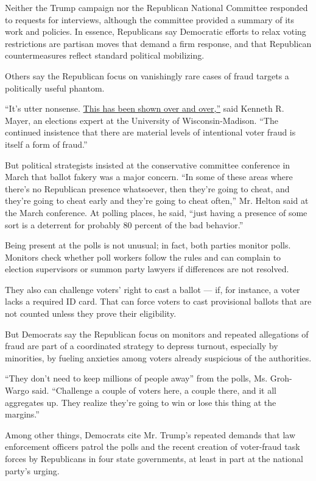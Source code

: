 Neither the Trump campaign nor the Republican National Committee
responded to requests for interviews, although the committee provided a
summary of its work and policies. In essence, Republicans say Democratic
efforts to relax voting restrictions are partisan moves that demand a
firm response, and that Republican countermeasures reflect standard
political mobilizing.

Others say the Republican focus on vanishingly rare cases of fraud
targets a politically useful phantom.

``It's utter nonsense.
\href{https://www.brennancenter.org/sites/default/files/legal-work/Briefing_Memo_Debunking_Voter_Fraud_Myth.pdf}{This
has been shown over and over,''} said Kenneth R. Mayer, an elections
expert at the University of Wisconsin-Madison. ``The continued
insistence that there are material levels of intentional voter fraud is
itself a form of fraud.''

But political strategists insisted at the conservative committee
conference in March that ballot fakery was a major concern. ``In some of
these areas where there's no Republican presence whatsoever, then
they're going to cheat, and they're going to cheat early and they're
going to cheat often,'' Mr. Helton said at the March conference. At
polling places, he said, ``just having a presence of some sort is a
deterrent for probably 80 percent of the bad behavior.''

Being present at the polls is not unusual; in fact, both parties monitor
polls. Monitors check whether poll workers follow the rules and can
complain to election supervisors or summon party lawyers if differences
are not resolved.

They also can challenge voters' right to cast a ballot --- if, for
instance, a voter lacks a required ID card. That can force voters to
cast provisional ballots that are not counted unless they prove their
eligibility.

But Democrats say the Republican focus on monitors and repeated
allegations of fraud are part of a coordinated strategy to depress
turnout, especially by minorities, by fueling anxieties among voters
already suspicious of the authorities.

``They don't need to keep millions of people away'' from the polls, Ms.
Groh-Wargo said. ``Challenge a couple of voters here, a couple there,
and it all aggregates up. They realize they're going to win or lose this
thing at the margins.''

Among other things, Democrats cite Mr. Trump's repeated demands that law
enforcement officers patrol the polls and the recent creation of
voter-fraud task forces by Republicans in four state governments, at
least in part at the national party's urging.

